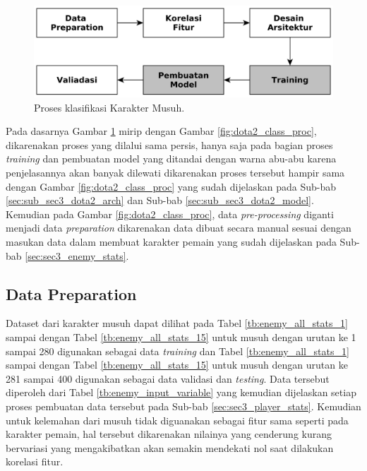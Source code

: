 \begin{figure} [!h] \centering
	\includegraphics[scale=0.035]{img/player_char_nn_classification.png}
	\caption{Proses klasifikasi Karakter Musuh.}
	\label{fig:enemy_class_proc}
\end{figure}

Pada dasarnya Gambar \ref{fig:enemy_class_proc} mirip dengan Gambar \ref{fig:dota2_class_proc}, dikarenakan proses yang dilalui sama persis, hanya saja pada bagian proses \textit{training} dan pembuatan model yang ditandai dengan warna abu-abu karena penjelasannya akan banyak dilewati dikarenakan proses tersebut hampir sama dengan Gambar \ref{fig:dota2_class_proc} yang sudah dijelaskan pada Sub-bab \ref{sec:sub_sec3_dota2_arch} dan Sub-bab \ref{sec:sub_sec3_dota2_model}. Kemudian pada Gambar \ref{fig:dota2_class_proc}, data \textit{pre-processing} diganti menjadi data \textit{preparation} dikarenakan data dibuat secara manual sesuai dengan masukan data dalam membuat karakter pemain yang sudah dijelaskan pada Sub-bab \ref{sec:sec3_enemy_stats}.
\vspace{1ex}

\subsection{Data Preparation}
\label{sec:sub_sec3_enemy_data_prep}
\vspace{1ex}

Dataset dari karakter musuh dapat dilihat pada Tabel \ref{tb:enemy_all_stats_1} sampai dengan Tabel \ref{tb:enemy_all_stats_15} untuk musuh dengan urutan ke 1 sampai 280 digunakan sebagai data \textit{training} dan Tabel \ref{tb:enemy_all_stats_1} sampai dengan Tabel \ref{tb:enemy_all_stats_15} untuk musuh dengan urutan ke 281 sampai 400 digunakan sebagai data validasi dan \textit{testing}. Data tersebut diperoleh dari Tabel \ref{tb:enemy_input_variable} yang kemudian dijelaskan setiap proses pembuatan data tersebut pada Sub-bab \ref{sec:sec3_player_stats}. Kemudian untuk kelemahan dari musuh tidak diguanakan sebagai fitur sama seperti pada karakter pemain, hal tersebut dikarenakan nilainya yang cenderung kurang bervariasi yang mengakibatkan akan semakin mendekati nol saat dilakukan korelasi fitur.
\vspace{1ex}

